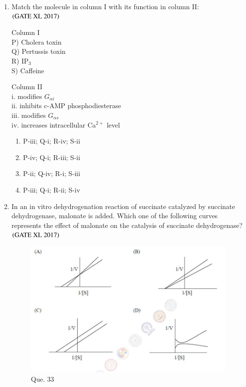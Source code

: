 \documentclass[journal]{IEEEtran}
\begin{document}
\begin{enumerate}
\item Match the molecule in column I with its function in column II:\hfill $\left(\text{GATE XL 2017}\right)$
\begin{multicols}{2}
\noindent Column I  \\
P) Cholera toxin \\
Q) Pertussis toxin \\
R) IP$_3$ \\
S) Caffeine  

\columnbreak

\noindent Column II  \\
i. modifies $G_{\alpha i}$ \\
ii. inhibits c-AMP phosphodiesterase \\
iii. modifies $G_{\alpha s}$ \\
iv. increases intracellular Ca$^{2+}$ level
\end{multicols}
\begin{enumerate}
\item P-iii; Q-i; R-iv; S-ii
\item P-iv; Q-i; R-iii; S-ii
\item P-ii; Q-iv; R-i; S-iii
\item P-iii; Q-i; R-ii; S-iv
\end{enumerate}

\item In an in vitro dehydrogenation reaction of succinate catalyzed by succinate dehydrogenase, malonate is added. Which one of the following curves represents the effect of malonate on the catalysis of succinate dehydrogenase?\hfill $\left(\text{GATE XL 2017}\right)$
\begin{figure}[H]
    \centering
    \includegraphics[width=0.9\columnwidth]{figs/q33_combined.png}
    \caption{Que. 33}
    \label{fig:placeholder}
\end{figure}


\end{enumerate}
\end{document}
